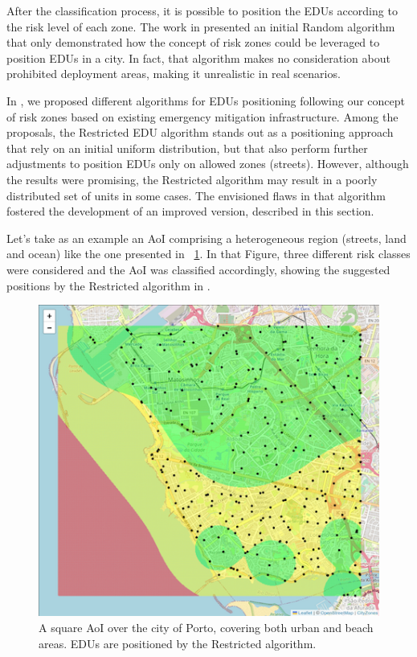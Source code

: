 \begin{refsection}
After the classification process, it is possible to position the EDUs according to the risk level of each zone. The work in \cite{riskzones} presented an initial Random algorithm that only demonstrated how the concept of risk zones could be leveraged to position EDUs in a city. In fact, that algorithm makes no consideration about prohibited deployment areas, making it unrealistic in real scenarios. 

In \cite{sustainable}, we proposed different algorithms for EDUs positioning following our concept of risk zones based on existing emergency mitigation infrastructure. Among the proposals, the Restricted EDU algorithm stands out as a positioning approach that rely on an initial uniform distribution, but that also perform further adjustments to position EDUs only on allowed zones (streets). However, although the results were promising, the Restricted algorithm may result in a poorly distributed set of units in some cases. The envisioned flaws in that algorithm fostered the development of an improved version, described in this section. 

Let's take as an example an AoI comprising a heterogeneous region (streets, land and ocean) like the one presented in \figurename~\ref{fig:porto_oceano_restricted}. In that Figure, three different risk classes were considered and the AoI was classified accordingly, showing the suggested positions by the Restricted algorithm in \cite{sustainable}. 

\begin{figure}[!ht]
  \centering
  \includegraphics[width=0.7\linewidth]{Chapters/5-AoM/img/porto_oceano_restricted.png}
  \caption{A square AoI over the city of Porto, covering both urban and beach areas. EDUs are positioned by the Restricted algorithm.}    \label{fig:porto_oceano_restricted}
\end{figure}


\end{refsection}
